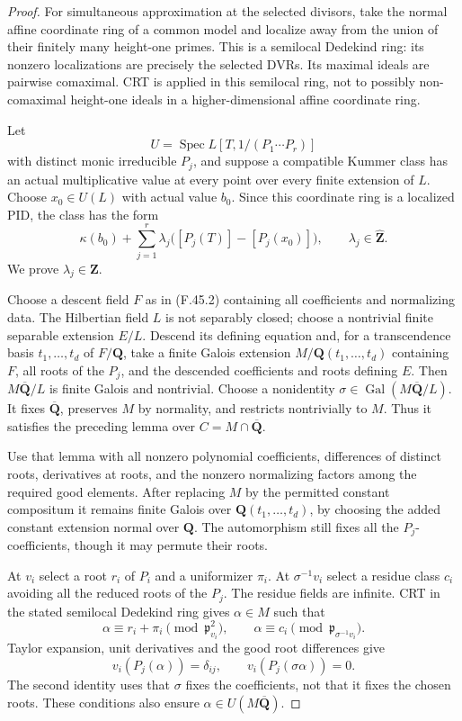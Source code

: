 \begin{proof}
For simultaneous approximation at the selected divisors, take the normal
affine coordinate ring of a common model and localize away from the union
of their finitely many height-one primes. This is a semilocal Dedekind
ring: its nonzero localizations are precisely the selected DVRs. Its
maximal ideals are pairwise comaximal. CRT is applied in this semilocal
ring, not to possibly non-comaximal height-one ideals in a
higher-dimensional affine coordinate ring.


Let
\[
 U=\operatorname{Spec}L[T,1/(P_1\cdots P_r)]
\]
with distinct monic irreducible \(P_j\), and suppose a compatible Kummer
class has an actual multiplicative value at every point over every finite
extension of \(L\). Choose \(x_0\in U(L)\) with actual value \(b_0\).
Since this coordinate ring is a localized PID, the class has the form
\[
 \kappa(b_0)+\sum_{j=1}^r\lambda_j
       \bigl([P_j(T)]-[P_j(x_0)]\bigr),
             \qquad\lambda_j\in\widehat{\mathbf Z}.       \tag{F.45.4}
\]
We prove \(\lambda_j\in\mathbf Z\).

Choose a descent field \(F\) as in \textup{(F.45.2)} containing all coefficients and
normalizing data. The Hilbertian field \(L\) is not separably closed;
choose a nontrivial finite separable extension \(E/L\). Descend its
defining equation and, for a transcendence basis \(t_1,\ldots,t_d\) of
\(F/\mathbf Q\), take a finite Galois extension
\(M/\mathbf Q(t_1,\ldots,t_d)\) containing \(F\), all roots of the
\(P_j\), and the descended coefficients and roots defining \(E\).
Then \(M\overline{\mathbf Q}/L\) is finite Galois and nontrivial.
Choose a nonidentity
\(\sigma\in\operatorname{Gal}(M\overline{\mathbf Q}/L)\).
It fixes \(\overline{\mathbf Q}\), preserves \(M\) by normality, and
restricts nontrivially to \(M\). Thus it satisfies the preceding lemma
over \(C=M\cap\overline{\mathbf Q}\).

Use that lemma with all nonzero polynomial coefficients, differences of distinct
roots, derivatives at roots, and the nonzero normalizing factors among
the required good elements. After replacing \(M\) by the permitted
constant compositum it remains finite Galois over
\(\mathbf Q(t_1,\ldots,t_d)\), by choosing the added constant extension
normal over \(\mathbf Q\). The automorphism still fixes all the
\(P_j\)-coefficients, though it may permute their roots.

At \(v_i\) select a root \(r_i\) of \(P_i\) and a uniformizer
\(\pi_i\). At \(\sigma^{-1}v_i\) select a residue class \(c_i\)
avoiding all the reduced roots of the \(P_j\). The residue fields are
infinite. CRT in the stated semilocal Dedekind ring gives \(\alpha\in M\)
such that
\[
 \alpha\equiv r_i+\pi_i\pmod{\mathfrak p_{v_i}^2},
 \qquad
 \alpha\equiv c_i\pmod{\mathfrak p_{\sigma^{-1}v_i}}.
\]
Taylor expansion, unit derivatives and the good root differences give
\[
 v_i(P_j(\alpha))=\delta_{ij},\qquad
 v_i(P_j(\sigma\alpha))=0.                                \tag{F.45.5}
\]
The second identity uses that \(\sigma\) fixes the coefficients, not
that it fixes the chosen roots. These conditions also ensure
\(\alpha\in U(M\overline{\mathbf Q})\).


\end{proof}

